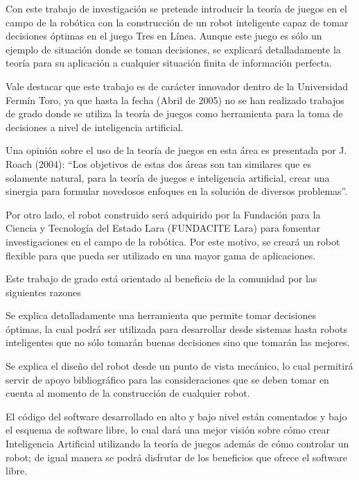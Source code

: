  Con este trabajo de investigación se pretende introducir la teoría de juegos en 
el campo de la robótica con la construcción de un robot inteligente capaz de tomar 
decisiones óptimas en el juego Tres en Línea. Aunque este juego es sólo un ejemplo 
de situación donde se toman decisiones, se explicará detalladamente la teoría para su 
aplicación a cualquier situación finita de información perfecta.  

 Vale destacar que este trabajo es de carácter innovador dentro de la 
Universidad Fermín Toro, ya que hasta la fecha (Abril de 2005) no se han realizado 
trabajos de grado donde se utiliza la teoría de juegos como herramienta para la toma 
de decisiones a nivel de inteligencia artificial.  

 Una opinión sobre el uso de la teoría de juegos en esta área es presentada por 
J. Roach (2004): \textquotedblleft Los objetivos de estas dos áreas son tan similares que es solamente 
natural, para la teoría de juegos e inteligencia artificial, crear una sinergia para 
formular novedosos enfoques en la solución de diversos problemas\textquotedblright. 
 
Por otro lado, el robot construido será adquirido por la Fundación para la 
Ciencia y Tecnología del Estado Lara (FUNDACITE Lara) para fomentar 
investigaciones en el campo de la robótica. Por este motivo, se creará un robot 
flexible para que pueda ser utilizado en una mayor gama de aplicaciones. 

Este trabajo de grado está orientado al beneficio de la comunidad por las 
siguientes razones 
\begin{enumeracion}
	\item Se explica detalladamente una herramienta que permite tomar decisiones óptimas, 
	la cual podrá ser utilizada para desarrollar desde sistemas hasta robots inteligentes 
	que no sólo tomarán buenas decisiones sino que tomarán las mejores. 
	\item  Se explica el diseño del robot desde un punto de vista mecánico, lo cual permitirá 
	servir de apoyo bibliográfico para las consideraciones que se deben tomar en 
	cuenta al momento de la construcción de cualquier robot. 
	\item El código del software desarrollado en alto y bajo nivel están comentados y bajo 
	el esquema de software libre, lo cual dará una mejor visión sobre cómo crear 
	Inteligencia Artificial utilizando la teoría de juegos además de cómo controlar un 
	robot; de igual manera se podrá disfrutar de los beneficios que ofrece el software 
	libre. 
\end{enumeracion}

